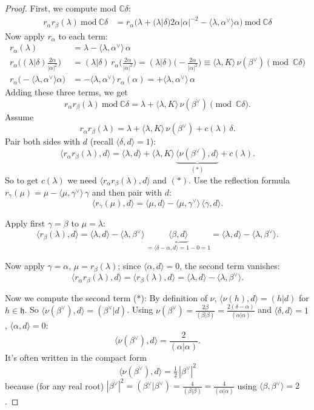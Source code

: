 \documentclass[12pt]{article}
\begin{document}
\begin{proof}
First, we compute mod $\mathbb{C}\delta$:
\[
\begin{aligned}
r_\alpha r_\beta(\lambda)\ \mathrm{mod}\ \mathbb{C}\delta
&= r_\alpha\bigl(\lambda +  (\lambda|\delta) 2\alpha|\alpha|^{-2} 
 - \langle \lambda, \alpha^\vee\rangle \alpha \bigr)\ \mathrm{mod}\ \mathbb{C}\delta 
\end{aligned}
\]
Now apply $r_\alpha$ to each term:
\begin{align*}
    r_\alpha(\lambda)&=\lambda-\langle\lambda,\alpha^\vee\rangle\,\alpha\\
r_\alpha\!\big((\lambda|\delta)\frac{2\alpha}{|\alpha|^2}\big)&=(\lambda|\delta)\,r_\alpha\!\big(\tfrac{2\alpha}{|\alpha|^2}\big)
=(\lambda|\delta)\Big(-\tfrac{2\alpha}{|\alpha|^2}\Big)
\equiv \langle\lambda,K\rangle\,\nu(\beta^\vee)\pmod{\mathbb C\delta}\\
r_\alpha\!\big(-\langle\lambda,\alpha^\vee\rangle\alpha\big)
&=-\langle\lambda,\alpha^\vee\rangle\,r_\alpha(\alpha)
=+\langle\lambda,\alpha^\vee\rangle\,\alpha
\end{align*}
Adding these three terms, we get
\[
r_\alpha r_\beta(\lambda)\ \mathrm{mod}\ \mathbb{C}\delta
= \lambda + \langle\lambda,K\rangle\,\nu(\beta^\vee) \pmod{\mathbb{C}\delta}.
\]
Assume
\[
    r_\alpha r_\beta(\lambda) = \lambda + \langle\lambda,K\rangle\,\nu(\beta^\vee) + c(\lambda)\,\delta.
\]
Pair both sides with $d$ (recall $\langle\delta,d\rangle=1$):
\[
    \langle r_\alpha r_\beta(\lambda),d\rangle = \langle\lambda,d\rangle + \langle\lambda,K\rangle\,\underbrace{\langle\nu(\beta^\vee),d\rangle}_{(*)} + c(\lambda).
\]
So to get $c(\lambda)$ we need $\langle r_\alpha r_\beta(\lambda),d\rangle$ and $(*)$. Use the reflection formula $r_\gamma(\mu)=\mu-\langle\mu,\gamma^\vee\rangle\,\gamma$ and then pair with $d$:
\[
    \langle r_\gamma(\mu),d\rangle = \langle\mu,d\rangle-\langle\mu,\gamma^\vee\rangle\,\langle\gamma,d\rangle.
\]

Apply first $\gamma=\beta$ to $\mu=\lambda$:
\[
    \langle r_\beta(\lambda),d\rangle = \langle\lambda,d\rangle-\langle\lambda,\beta^\vee\rangle\,\underbrace{\langle\beta,d\rangle}_{=\langle\delta-\alpha,d\rangle=1-0=1} = \langle\lambda,d\rangle-\langle\lambda,\beta^\vee\rangle.
\]

Now apply $\gamma=\alpha$, $\mu=r_\beta(\lambda)$; since $\langle\alpha,d\rangle=0$, the second term vanishes:
\[
    \langle r_\alpha r_\beta(\lambda),d\rangle = \langle r_\beta(\lambda),d\rangle = \langle\lambda,d\rangle-\langle\lambda,\beta^\vee\rangle.
\]

Now we compute the second term (*): By definition of $\nu$, $\langle\nu(h),d\rangle=(h|d)$ for $h\in\mathfrak h$. So
$\langle\nu(\beta^\vee),d\rangle=(\beta^\vee|d)$. Using $\nu(\beta^\vee)=\frac{2\beta}{(\beta|\beta)}=\frac{2(\delta-\alpha)}{(\alpha|\alpha)}$ and $\langle\delta,d\rangle=1$, $\langle\alpha,d\rangle=0$:
\[
    \langle\nu(\beta^\vee),d\rangle=\frac{2}{(\alpha|\alpha)}.
\]
It's often written in the compact form
\[
    \langle\nu(\beta^\vee),d\rangle=\tfrac12\,|\beta^\vee|^2
\]
because (for any real root) $|\beta^\vee|^2=(\beta^\vee|\beta^\vee)=\frac{4}{(\beta|\beta)}=\frac{4}{(\alpha|\alpha)}$ using $\langle\beta,\beta^\vee\rangle=2$.


\end{proof}
\end{document}

